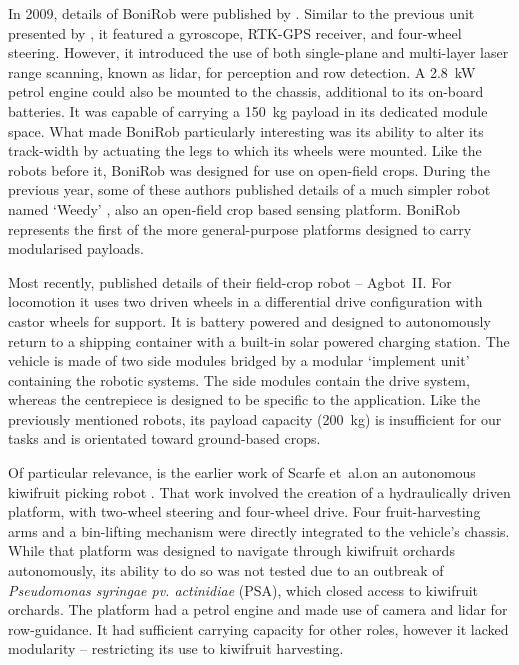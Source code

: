 \documentclass[preprint,authoryear,12pt]{elsarticle}
\begin{document}
        In 2009, details of BoniRob were published by \cite{Ruckelshausen2009}.
        Similar to the previous unit presented by \cite{Bak2004}, it featured a gyroscope, RTK-GPS receiver, and four-wheel steering.
        However, it introduced the use of both single-plane and multi-layer laser range scanning, known as lidar, for perception and row detection.
        A \SI{2.8}{\kilo\watt} petrol engine could also be mounted to the chassis, additional to its on-board batteries.
        It was capable of carrying a \SI{150}{\kilo\gram} payload in its dedicated module space.
        What made BoniRob particularly interesting was its ability to alter its track-width by actuating the legs to which its wheels were mounted.
        Like the robots before it, BoniRob was designed for use on open-field crops.
        During the previous year, some of these authors published details of a much simpler robot named `Weedy' \citep{Klose2008}, also an open-field crop based sensing platform.
        BoniRob represents the first of the more general-purpose platforms designed to carry modularised payloads.

        Most recently, \cite{Bawden2017} published details of their field-crop robot -- Agbot~II.
        For locomotion it uses two driven wheels in a differential drive configuration with castor wheels for support.
        It is battery powered and designed to autonomously return to a shipping container with a built-in solar powered charging station.
        The vehicle is made of two side modules bridged by a modular `implement unit' containing the robotic systems.
        The side modules contain the drive system, whereas the centrepiece is designed to be specific to the application.
        Like the previously mentioned robots, its payload capacity (\SI{200}{\kilo\gram}) is insufficient for our tasks and is orientated toward ground-based crops.

        Of particular relevance, is the earlier work of Scarfe et~al.\@ on an autonomous kiwifruit picking robot \citep{scarfe2009, Scarfe2012}.
        That work involved the creation of a hydraulically driven platform, with two-wheel steering and four-wheel drive.
        Four fruit-harvesting arms and a bin-lifting mechanism were directly integrated to the vehicle's chassis.
        While that platform was designed to navigate through kiwifruit orchards autonomously, its ability to do so was not tested due to an outbreak of \textit{Pseudomonas syringae pv. actinidiae} (PSA), which closed access to kiwifruit orchards.
        The platform had a petrol engine and made use of camera and lidar for row-guidance.
        It had sufficient carrying capacity for other roles, however it lacked modularity -- restricting its use to kiwifruit harvesting.
\end{document}
